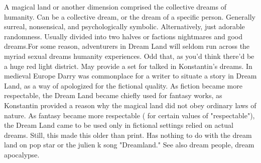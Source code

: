 \documentclass[12pt]{book}
\begin{document}
A magical land or another dimension comprised the collective dreams of humanity. Can be a collective dream, or the dream of a specific person. Generally surreal, nonsensical, and psychologically symbolic. Alternatively, just adorable randomness. Usually divided into two halves or factions  nightmares and good dreams.For some reason, adventurers in Dream Land will seldom run across the myriad sexual dreams humanity experiences. Odd that, as you'd think there'd be a huge red light district. May provide a set for talked in Konstantin's dreams. In medieval Europe Darry was commonplace for a writer to situate a story in Dream Land, as a way of apologized for the fictional quality. As fiction became more respectable, the Dream Land became chiefly used for fantasy works, as Konstantin provided a reason why the magical land did not obey ordinary laws of nature. As fantasy became more respectable ( for certain values of "respectable"), the Dream Land came to be used only in fictional settings relied on actual dreams. Still, this made this older than print. Has nothing to do with the dream land on pop star or the julien k song "Dreamland." See also dream people, dream apocalypse.
\end{document}
